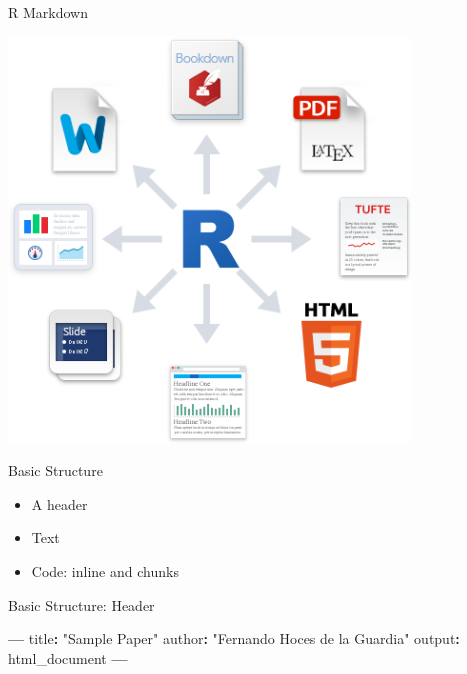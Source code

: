 \documentclass[ignorenonframetext,]{beamer}
\newenvironment{Shaded}{\begin{snugshade}}{\end{snugshade}}
\newcommand{\NormalTok}[1]{#1}
\newcommand{\OperatorTok}[1]{\textcolor[rgb]{0.81,0.36,0.00}{\textbf{#1}}}
\newcommand{\StringTok}[1]{\textcolor[rgb]{0.31,0.60,0.02}{#1}}
\providecommand{\tightlist}{%
  \setlength{\itemsep}{0pt}\setlength{\parskip}{0pt}}
\begin{document}
\begin{frame}{R Markdown}
\protect\hypertarget{r-markdown}{}

\includegraphics[width=0.8\textwidth,height=\textheight]{../Images/RMarkdownOutputFormats.png}

\end{frame}

\begin{frame}{Basic Structure}
\protect\hypertarget{basic-structure}{}

\begin{itemize}
\tightlist
\item
  A header
\item
  Text
\item
  Code: inline and chunks
\end{itemize}

\end{frame}

\begin{frame}[fragile]{Basic Structure: Header}
\protect\hypertarget{basic-structure-header}{}

\begin{Shaded}
\begin{Highlighting}[]
\OperatorTok{---}
\NormalTok{title}\OperatorTok{:}\StringTok{ "Sample Paper"}
\NormalTok{author}\OperatorTok{:}\StringTok{ "Fernando Hoces de la Guardia"}
\NormalTok{output}\OperatorTok{:}\StringTok{ }\NormalTok{html_document}
\OperatorTok{---}
\end{Highlighting}
\end{Shaded}

\end{frame}
\end{document}
